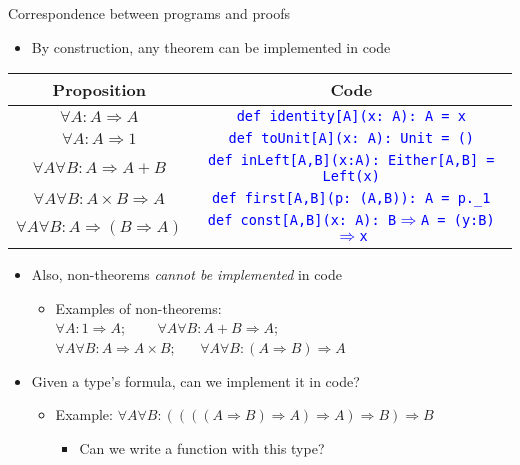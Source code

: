 \documentclass[english]{beamer}
\providecommand{\tabularnewline}{\\}
\begin{document}
\begin{frame}{Correspondence between programs and proofs}

\begin{itemize}
\item By construction, any theorem can be implemented in code
\end{itemize}
\begin{center}
\begin{tabular}{|c|c|}
\hline 
\textbf{Proposition} &
\textbf{Code}\tabularnewline
\hline 
\hline 
$\forall A:A\Rightarrow A$ &
\texttt{\textcolor{blue}{\footnotesize{}def identity{[}A{]}(x:\ A):\ A
= x}}\tabularnewline
\hline 
$\forall A:A\Rightarrow1$ &
\texttt{\textcolor{blue}{\footnotesize{}def toUnit{[}A{]}(x:\ A): Unit
= ()}}\tabularnewline
\hline 
$\forall A\forall B:A\Rightarrow A+B$ &
\texttt{\textcolor{blue}{\footnotesize{}def inLeft{[}A,B{]}(x:A):\ Either{[}A,B{]}
= Left(x)}}\tabularnewline
\hline 
$\forall A\forall B:A\times B\Rightarrow A$ &
\texttt{\textcolor{blue}{\footnotesize{}def first{[}A,B{]}(p:\ (A,B)):\ A
= p.\_1}}\tabularnewline
\hline 
$\forall A\forall B:A\Rightarrow(B\Rightarrow A)$ &
\texttt{\textcolor{blue}{\footnotesize{}def const{[}A,B{]}(x:\ A):\ B$\Rightarrow$A
= (y:B)$\Rightarrow$x}}\tabularnewline
\hline 
\end{tabular}
\par\end{center}
\begin{itemize}
\item Also, non-theorems \emph{cannot be implemented} in code 
\begin{itemize}
\item Examples of non-theorems:\\
 $\forall A:1\Rightarrow A$; \  \  $\quad\forall A\forall B:A+B\Rightarrow A$;
\\
$\forall A\forall B:A\Rightarrow A\times B$; \  $\quad\forall A\forall B:(A\Rightarrow B)\Rightarrow A$
\end{itemize}
\item Given a type's formula, can we implement it in code?
\begin{itemize}
\item Example: $\forall A\forall B:((((A\Rightarrow B)\Rightarrow A)\Rightarrow A)\Rightarrow B)\Rightarrow B$
\begin{itemize}
\item Can we write a function with this type?
\end{itemize}
\end{itemize}
\end{itemize}
\end{frame}
\end{document}
